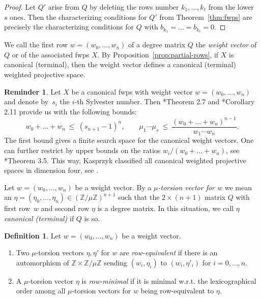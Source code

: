 \documentclass{amsart}
\newcommand{\Z}{\mathbb{Z}}
\theoremstyle{plain}
\theoremstyle{definition}
\newtheorem{definition}[theorem]{Definition}
\newtheorem{reminder}[theorem]{Reminder}
\begin{document}
\begin{proof}
Let $Q'$ arise from $Q$ by deleting the rows number $k_1, \dots, k_t$
from the lower~$s$ ones.
Then the characterizing conditions for $Q'$ from Theorem~\ref{thm:fwps} are
precisely the characterizing conditions for $Q$ with
$b_{k_1} = \dots = b_{k_t} = 0$.
\end{proof}


We call the first row $w = (w_0, \ldots,w_n)$ of a degree matrix $Q$
the \emph{weight vector} of $Q$ or of the associated fwps $X$.
By Proposition~\ref{prop:partial-rows}, if $X$ is canonical
(terminal), then the weight vector defines a canonical (terminal)
weighted projective space.


\begin{reminder}\label{rem:bounds}
Let $X$ be a canonical fwps with weight vector $w = (w_0, \ldots,w_n)$ and 
denote by~$s_i$ the $i$-th Sylvester number. Then \cite{AKN}*{Theorem 2.7} and
\cite{Kas1}*{Corollary 2.11} provide us with the following bounds:
$$
w_0 + \ldots + w_n \ \leq \ (s_{n+1}-1)^n,
\qquad
\mu_1\cdots\mu_s \ \leq \ \frac{(w_0 + \ldots + w_n)^{n-1}}{w_1  \cdots w_n}.
$$
The first bound gives a finite search space for the canonical weight
vectors.
One can further restrict by upper bounds on the ratios $w_i/(w_0 + \ldots + w_n)$,
see \cite{Kas1}*{Theorem 3.5}. This way, Kasprzyk classified all canonical
weighted projective spaces in dimension four, see \cite{Kas2}.
\end{reminder}


Let $w=(w_0,\dots,w_n)$ be a weight vector. By a
\emph{$\mu$-torsion vector for $w$} we mean an
$\eta=(\eta_0,\dots,\eta_n) \in (\Z/\mu\Z)^{n+1}$ 
such that the $2 \times (n+1)$ matrix $Q$ with first
row~$w$ and second row $\eta$ is a degree matrix.
In this situation, we call $\eta$
\emph{canonical (terminal)} if $Q$ is so. 


\begin{definition}
Let $w = (w_0,\ldots,w_n)$ be a weight vector.
\begin{enumerate}
\item
Two $\mu$-torsion vectors $\eta, \eta'$ for $w$ are \emph{row-equivalent}
if there is an automorphism of $\Z\times\Z/\mu\Z$ sending $(w_i,\eta_i)$
to $(w_i,\eta'_i)$ for $i=0,\dots,n$.
\item
A $\mu$-torsion vector $\eta$ is \emph{row-minimal} if it is minimal w.r.t.
the lexicographical order among all $\mu$-torsion vectors for $w$ being
row-equivalent to $\eta$.
\end{enumerate}
\end{definition}
\end{document}
